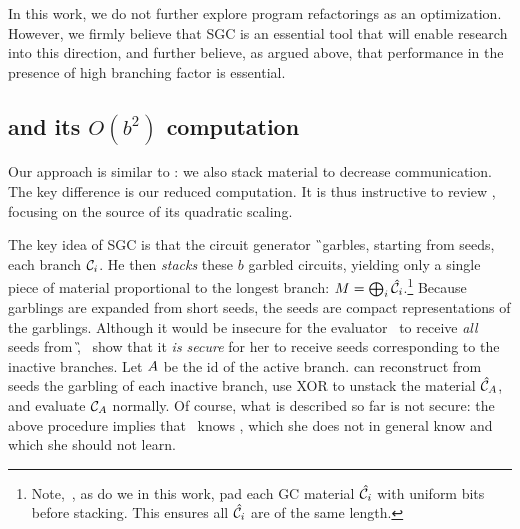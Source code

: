 In this work, we do not further explore program refactorings as an
optimization.
However, we firmly believe that SGC is an essential tool that will
enable research into this direction, and further believe, as argued
above, that performance in the presence of high branching factor is
essential.




\subsection{\HK and its $O(b^2)$ computation}
\label{sec:bsquaredcost}

Our approach is similar to \HK: we also stack material
to decrease communication.
The key difference is our reduced computation.
It is thus instructive to review \HK,
focusing on the source of its quadratic scaling.

The key idea of SGC is that the circuit generator \G\ garbles,
starting from seeds, each branch $\mathcal C_i$.
He then \emph{stacks} these $b$ garbled circuits, yielding only a
single piece of material proportional to the longest branch: $M =
\bigoplus_i \hat{\mathcal C}_i$.\footnote{Note,~\HK, as do we in this work,  pad each GC
material $\hat{\mathcal C}_i$ with uniform bits before stacking.  This ensures all
$\hat{\mathcal C}_i$ are of the same length.}
Because garblings are expanded from short seeds, the
seeds are compact representations of the garblings.
%
Although it would be insecure for the evaluator \E\ to receive
\emph{all} seeds from \G, \HK\ show that it \emph{is secure} for her
to receive seeds corresponding to the inactive branches.
Let $A$ be the id of the active branch.
\E can reconstruct from seeds the garbling of each inactive branch, use XOR to unstack
the material $\hat{\mathcal C}_{A}$, and evaluate $\mathcal C_{A}$ normally.
%
Of course, what is described so far is not secure: the above procedure
implies that \E\ knows \aid, which she does not in general
know and which she should not learn.


